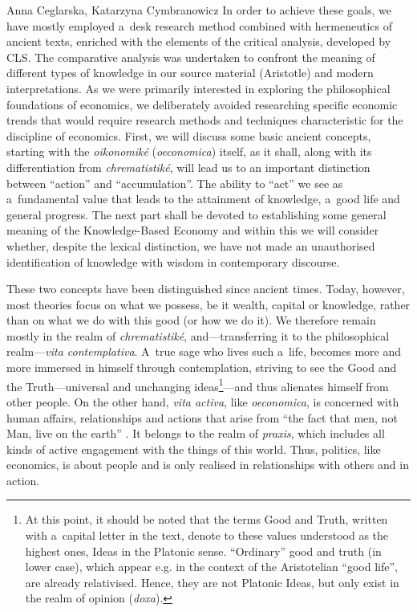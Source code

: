\begin{artengenv2auth}{Anna Ceglarska, Katarzyna Cymbranowicz}
In order to achieve these goals, we have mostly employed a~desk research method combined with hermeneutics of ancient texts, enriched with the elements of the critical analysis, developed by CLS. The comparative analysis was undertaken to confront the meaning of different types of knowledge in our source material (Aristotle) and modern interpretations. As we were primarily interested in exploring the philosophical foundations of economics, we deliberately avoided researching specific economic trends that would require research methods and techniques characteristic for the discipline of economics. First, we will discuss some basic ancient concepts, starting with the \textit{oikonomiké} (\textit{oeconomica}) itself, as it shall, along with its differentiation from \textit{chrematistiké}, will lead us to an important distinction between ``action'' and ``accumulation''. The ability to ``act'' we see as a~fundamental value that leads to the attainment of knowledge, a~good life and general progress. The next part shall be devoted to establishing some general meaning of the Knowledge-Based Economy and within this we will consider whether, despite the lexical distinction, we have not made an unauthorised identification of knowledge with wisdom in contemporary discourse.



These two concepts have been distinguished since ancient times. Today, however, most theories focus on what we possess, be it wealth, capital or knowledge, rather than on what we do with this good (or how we do it). We therefore remain mostly in the realm of \textit{chrematistiké}, and---transferring it to the philosophical realm---\textit{vita contemplativa}. A~true sage who lives such a~life, becomes more and more immersed in himself through contemplation, striving to see the Good and the Truth---universal and unchanging ideas\footnote{At this point, it should be noted that the terms Good and Truth, written with a~capital letter in the text, denote to these values understood as the highest ones, Ideas in the Platonic sense. ``Ordinary'' good and truth (in lower case), which appear e.g. in the context of the Aristotelian ``good life'', are already relativised. Hence, they are not Platonic Ideas, but only exist in the realm of opinion (\textit{doxa}).}---and thus alienates himself from other people. On the other hand, \textit{vita activa}, like \textit{oeconomica}, is concerned with human affairs, relationships and actions that arise from ``the fact that men, not Man, live on the earth'' 
\parencite[][p.7]{arendt_human_1998}. %
 It belongs to the realm of \textit{praxis}, which includes all kinds of active engagement with the things of this world. Thus, politics, like economics, is about people and is only realised in relationships with others and in action.




\end{artengenv2auth}
